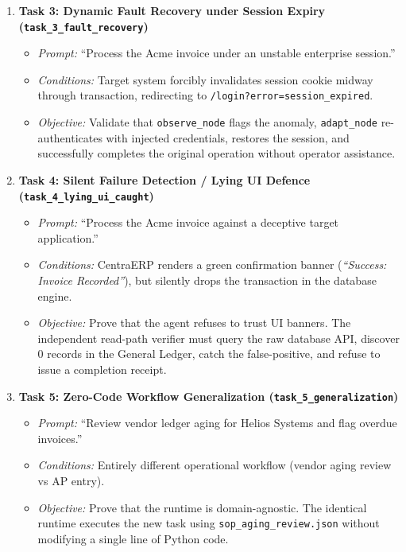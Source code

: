 \begin{enumerate}[leftmargin=*]
  \item \textbf{Task 3: Dynamic Fault Recovery under Session Expiry (\texttt{task\_3\_fault\_recovery})}
  \begin{itemize}
    \item \textit{Prompt:} ``Process the Acme invoice under an unstable enterprise session.''
    \item \textit{Conditions:} Target system forcibly invalidates session cookie midway through transaction, redirecting to \texttt{/login?error=session\_expired}.
    \item \textit{Objective:} Validate that \texttt{observe\_node} flags the anomaly, \texttt{adapt\_node} re-authenticates with injected credentials, restores the session, and successfully completes the original operation without operator assistance.
  \end{itemize}

  \item \textbf{Task 4: Silent Failure Detection / Lying UI Defence (\texttt{task\_4\_lying\_ui\_caught})}
  \begin{itemize}
    \item \textit{Prompt:} ``Process the Acme invoice against a deceptive target application.''
    \item \textit{Conditions:} CentraERP renders a green confirmation banner (\textit{``Success: Invoice Recorded''}), but silently drops the transaction in the database engine.
    \item \textit{Objective:} Prove that the agent refuses to trust UI banners. The independent read-path verifier must query the raw database API, discover 0 records in the General Ledger, catch the false-positive, and refuse to issue a completion receipt.
  \end{itemize}

  \item \textbf{Task 5: Zero-Code Workflow Generalization (\texttt{task\_5\_generalization})}
  \begin{itemize}
    \item \textit{Prompt:} ``Review vendor ledger aging for Helios Systems and flag overdue invoices.''
    \item \textit{Conditions:} Entirely different operational workflow (vendor aging review vs AP entry).
    \item \textit{Objective:} Prove that the runtime is domain-agnostic. The identical runtime executes the new task using \texttt{sop\_aging\_review.json} without modifying a single line of Python code.
  \end{itemize}
\end{enumerate}

